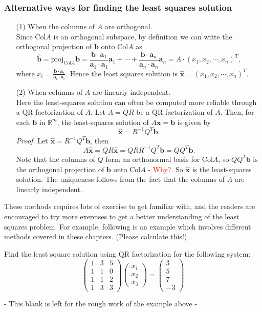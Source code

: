 \documentclass[10pt, a4paper]{article}
\newcommand{\R}{\mathbb{R}}
\newcommand{\vt}[1]{\mathbf{#1}}
\begin{document}
\subsubsection*{Alternative ways for finding the least squares solution}
\begin{itemize}
    \item[(1)] When the columns of $A$ are orthogonal.\\
    Since Col$A$ is an orthogonal subspace, by definition we can write the orthogonal projection of $\vt{b}$ onto Col$A$ as\[
    \hat{\vt{b}} = \text{proj}_{\text{Col}A}\vt{b} = \frac{\vt{b}\cdot\vt{a}_1}{\vt{a}_1\cdot\vt{a}_1}\vt{a}_1 + \cdots + \frac{\vt{b}\cdot\vt{a}_n}{\vt{a}_n\cdot\vt{a}_n}\vt{a}_n = A\cdot (x_1, x_2, \cdots, x_n)^T,
    \]
    where $x_i=\frac{\vt{b}\cdot\vt{a}_i}{\vt{a}_i\cdot\vt{a}_i}$. Hence the least squares solution is $\hat{\vt{x}}=(x_1, x_2, \cdots, x_n)^T$.
    \item[(2)] When columns of $A$ are linearly independent.\\
    Here the least-squares solution can often be computed more reliable through a QR factorization of $A$. Let $A=QR$ be a QR factorization of $A$.
    Then, for each $\vt{b}$ in $\R^m$, the least-squares solution of $A\vt{x}=\vt{b}$ is given by\[
    \hat{\vt{x}} = R^{-1}Q^T\vt{b}.
    \]
    \indent\textit{Proof.} Let $\hat{\vt{x}}=R^{-1}Q^T\vt{b}$, then\[
    A\hat{\vt{x}}=QR\hat{\vt{x}}=QRR^{-1}Q^T\vt{b}=QQ^T\vt{b}.
    \]
    Note that the columns of $Q$ form an orthonormal basis for Col$A$, so $QQ^T\vt{b}$ is the orthogonal projection of $\vt{b}$ onto Col$A$ - \textcolor{red}{Why?}. So $\hat{\vt{x}}$ is the least-squares solution. The uniqueness follows from the fact that the columns of $A$ are linearly independent.
\end{itemize}

\indent These methods requires lots of exercise to get familiar with, and the readers are encouraged to try more exercises to get a better understanding of the least squares problem. For example, following is an example which involves different methods covered in these chapters. (Please calculate this!)
\begin{example}
    Find the least square solution using QR factorization for the following system:\[
    \begin{pmatrix}
        1&3&5\\1&1&0\\1&1&2\\1&3&3
    \end{pmatrix}\begin{pmatrix}
        x_1\\x_2\\x_3
    \end{pmatrix}=\begin{pmatrix}
        3\\5\\7\\-3
    \end{pmatrix}
    \]
\end{example}
- This blank is left for the rough work of the example above -\\
\newpage
\end{document}
